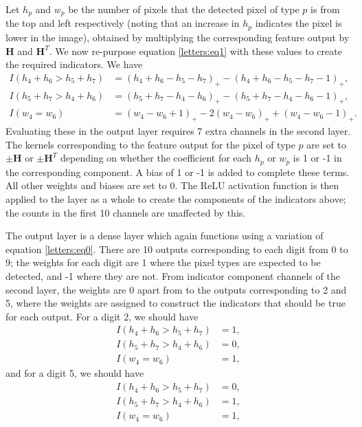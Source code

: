 \documentclass{somasmsc}
\begin{document}
Let $h_p$ and $w_p$ be the number of pixels that the detected pixel of type $p$ is from the top and left respectively (noting that an increase in $h_p$ indicates the pixel is lower in the image), obtained by multiplying the corresponding feature output by $\mathbf{H}$ and $\mathbf{H}^T$. We now re-purpose equation \ref{letters:eq1} with these values to create the required indicators. We have
\begin{align*}
    I\left(h_4 + h_6 > h_5 + h_7\right) &= \left(h_4 + h_6 - h_5 - h_7\right)_+ - \left(h_4 + h_6 - h_5 - h_7 - 1\right)_+, \\
    I\left(h_5 + h_7 > h_4 + h_6\right) &= \left(h_5 + h_7 - h_4 - h_6\right)_+ - \left(h_5 + h_7 - h_4 - h_6 - 1\right)_+, \\
    I\left(w_4 = w_6\right) &= \left(w_4 - w_6 + 1\right)_+ - 2\left(w_4 - w_6\right)_+ + \left(w_4 - w_6 - 1\right)_+.
\end{align*}
Evaluating these in the output layer requires 7 extra channels in the second layer. The kernels corresponding to the feature output for the pixel of type $p$ are set to $\pm \mathbf{H}$ or $\pm \mathbf{H}^T$ depending on whether the coefficient for each $h_p$ or $w_p$ is 1 or -1 in the corresponding component. A bias of 1 or -1 is added to complete these terms. All other weights and biases are set to 0. The ReLU activation function is then applied to the layer as a whole to create the components of the indicators above; the counts in the first 10 channels are unaffected by this.

The output layer is a dense layer which again functions using a variation of equation \ref{letters:eq0}. There are 10 outputs corresponding to each digit from 0 to 9; the weights for each digit are 1 where the pixel types are expected to be detected, and -1 where they are not. From indicator component channels of the second layer, the weights are 0 apart from to the outputs corresponding to 2 and 5, where the weights are assigned to construct the indicators that should be true for each output. For a digit 2, we should have
\begin{align*}
    I\left(h_4 + h_6 > h_5 + h_7\right) &= 1, \\
    I\left(h_5 + h_7 > h_4 + h_6\right) &= 0, \\
    I\left(w_4 = w_6\right) &= 1,
\end{align*}
and for a digit 5, we should have
\begin{align*}
    I\left(h_4 + h_6 > h_5 + h_7\right) &= 0, \\
    I\left(h_5 + h_7 > h_4 + h_6\right) &= 1, \\
    I\left(w_4 = w_6\right) &= 1,
\end{align*}
\end{document}
